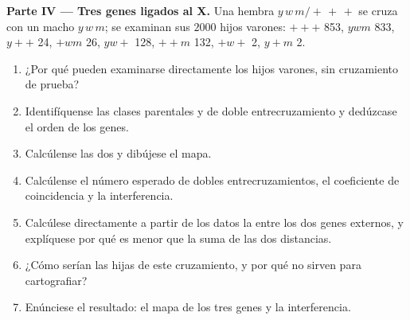 \begin{problem}
\medskip
\noindent\textbf{Parte IV --- Tres genes ligados al X.}
Una hembra $y\,w\,m/+\,+\,+$ se cruza con un macho $y\,w\,m$; se examinan
sus $2000$
hijos varones: $+++$ 853, $ywm$ 833, $y++$ 24, $+wm$ 26, $yw+$ 128,
$++m$ 132, $+w+$ 2, $y+m$ 2.
\begin{enumerate}[resume]
  \item ¿Por qué pueden examinarse directamente los hijos varones, sin
        cruzamiento de prueba?
  \item Identifíquense las clases parentales y de doble entrecruzamiento y
        dedúzcase el orden de los genes.
  \item Calcúlense las dos  y dibújese el mapa.
  \item Calcúlense el número esperado de dobles entrecruzamientos, el
        coeficiente de coincidencia y la interferencia.
  \item Calcúlese directamente a partir de los datos la  entre los dos genes externos, y explíquese por qué
        es menor que la suma de las dos distancias.
  \item ¿Cómo serían las hijas de este cruzamiento, y por qué no sirven
        para cartografiar?
  \item Enúnciese el resultado: el mapa de los tres genes y la
        interferencia.
\end{enumerate}
\end{problem}
